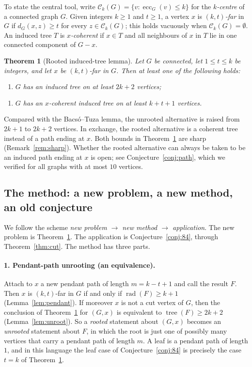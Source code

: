 \documentclass[11pt,a4paper]{article}
\newtheorem{theorem}{Theorem}[section]
\theoremstyle{definition}
\newcommand{\rad}{\operatorname{rad}}
\newcommand{\ecc}{\operatorname{ecc}}
\newcommand{\tr}{\operatorname{tree}}
\newcommand{\C}{\mathcal{C}}
\begin{document}
To state the central tool, write $\C_k(G)=\{v:\ecc_G(v)\le k\}$ for the \emph{$k$-centre} of a connected graph $G$. Given integers $k\ge1$ and $t\ge1$, a vertex $x$ is \emph{$(k,t)$-far} in $G$ if $d_G(x,z)\ge t$ for every $z\in\C_k(G)$; this holds vacuously when $\C_k(G)=\emptyset$. An induced tree $T$ is \emph{$x$-coherent} if $x\in T$ and all neighbours of $x$ in $T$ lie in one connected component of $G-x$.

\begin{theorem}[Rooted induced-tree lemma]\label{thm:rooted}
Let $G$ be connected, let $1\le t\le k$ be integers, and let $x$ be $(k,t)$-far in $G$. Then at least one of the following holds:
\begin{enumerate}[label=\textup{(T)},leftmargin=3em]
\item $G$ has an induced tree on at least $2k+2$ vertices;
\end{enumerate}
\begin{enumerate}[label=\textup{(R)},leftmargin=3em]
\item $G$ has an $x$-coherent induced tree on at least $k+t+1$ vertices.
\end{enumerate}
\end{theorem}

Compared with the Bacs\'o--Tuza lemma, the unrooted alternative is raised from $2k+1$ to $2k+2$ vertices. In exchange, the rooted alternative is a coherent tree instead of a path ending at $x$. Both bounds in Theorem~\ref{thm:rooted} are sharp (Remark~\ref{rem:sharp}). Whether the rooted alternative can always be taken to be an induced path ending at $x$ is open; see Conjecture~\ref{conj:path}, which we verified for all graphs with at most $10$ vertices.

\subsection{The method: a new problem, a new method, an old conjecture}

We follow the scheme \emph{new problem $\to$ new method $\to$ application}. The new problem is Theorem~\ref{thm:rooted}. The application is Conjecture~\ref{conj:84}, through Theorem~\ref{thm:cut}. The method has three parts.

\paragraph{1. Pendant-path unrooting (an equivalence).} Attach to $x$ a new pendant path of length $m=k-t+1$ and call the result $F$. Then $x$ is $(k,t)$-far in $G$ if and only if $\rad(F)\ge k+1$ (Lemma~\ref{lem:pendant}). If moreover $x$ is not a cut vertex of $G$, then the conclusion of Theorem~\ref{thm:rooted} for $(G,x)$ is equivalent to $\tr(F)\ge 2k+2$ (Lemma~\ref{lem:unroot}). So a \emph{rooted} statement about $(G,x)$ becomes an \emph{unrooted} statement about $F$, in which the root is just one of possibly many vertices that carry a pendant path of length $m$. A leaf is a pendant path of length $1$, and in this language the leaf case of Conjecture~\ref{conj:84} is precisely the case $t=k$ of Theorem~\ref{thm:rooted}.
\end{document}
